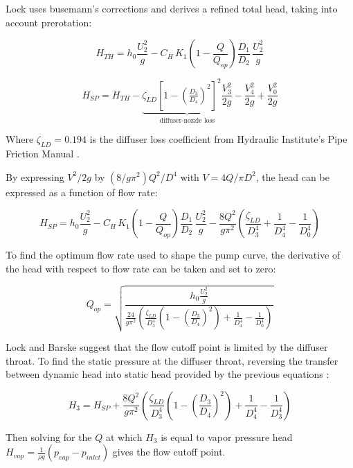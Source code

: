 Lock uses busemann's corrections and derives a refined total head, taking into account prerotation:

\begin{equation}
    H_{TH} = h_0\frac{U_2^2}{g} - C_H\,K_1\!\left(1-\frac{Q}{Q_{op}}\right)\!\frac{D_1}{D_2}\,\frac{U_2^2}{g}
    \label{eq:lock_total_head}
\end{equation}

\begin{equation}
H_{SP} = H_{TH} - \underbrace{\zeta_{LD}\left[1-\left(\tfrac{D_3}{D_4}\right)^2\right]^2\frac{V_3^2}{2g}}_{\text{diffuser-nozzle loss}} - \frac{V_4^2}{2g} + \frac{V_0^2}{2g}
\label{eq:lock_static_head}
\end{equation}

Where $\zeta_{LD}=0.194$ is the diffuser loss coefficient from Hydraulic Institute's Pipe Friction Manual \cite{hydraulicpipemanual}.

By expressing $V^2/2g$ by $(8/g\pi^2)Q^2/D^4$ with $V=4Q/\pi D^2$, the head can be expressed as a function of flow rate:

\begin{equation}
    H_{SP} = h_0\frac{U_2^2}{g} - C_H\,K_1\!\left(1-\frac{Q}{Q_{op}}\right)\!\frac{D_1}{D_2}\,\frac{U_2^2}{g} - \frac{8Q^2}{g\pi^2}\left(\frac{\zeta_{LD}}{D_3^4} + \frac{1}{D_4^4} - \frac{1}{D_0^4}\right)
    \label{eq:lock_static_head_flow}
\end{equation}

To find the optimum flow rate used to shape the pump curve, the derivative of the head with respect to flow rate can be taken and set to zero:

\begin{equation}
    Q_{op} = \sqrt{\frac{h_0\frac{U_2^2}{g}}{\frac{24}{g\pi^2}\left(\frac{\zeta_{LD}}{D_3^4}\left(1-\left(\tfrac{D_3}{D_4}\right)^2\right) + \frac{1}{D_4^4} - \frac{1}{D_0^4}\right)}}
    \label{eq:lock_optimum_flow}
\end{equation}

Lock and Barske suggest that the flow cutoff point is limited by the diffuser throat. To find the static pressure at the diffuser throat, reversing the transfer between dynamic head into static head provided by the previous equations :

\begin{equation}
    H_3 = H_{SP} + \frac{8Q^2}{g\pi^2}\left(\frac{\zeta_{LD}}{D_3^4}\left(1-\left(\frac{D_3}{D_4}\right)^2\right) + \frac{1}{D_4^4} - \frac{1}{D_3^4}\right)
    \label{eq:lock_diffuser_throat}
\end{equation}

Then solving for the $Q$ at which $H_3$ is equal to vapor pressure head $H_{vap}=\frac{1}{\rho g}\left(p_{vap}-p_{inlet}\right)$ gives the flow cutoff point.


